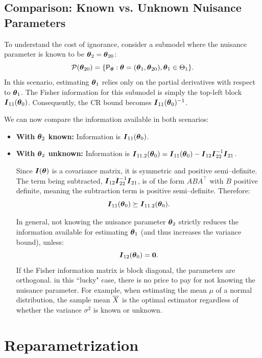 \subsection{Comparison: Known vs. Unknown Nuisance Parameters}

To understand the cost of ignorance, consider a submodel where the nuisance parameter is known to be $\boldsymbol{\theta}_2 = \boldsymbol{\theta}_{20}$:
\[
\mathcal{P}(\boldsymbol{\theta}_{20}) = \{ \mathsf{P}_{\boldsymbol{\theta}} : \boldsymbol{\theta} = (\boldsymbol{\theta}_1, \boldsymbol{\theta}_{20}), \boldsymbol{\theta}_1 \in \Theta_1 \}.
\]
In this scenario, estimating $\boldsymbol{\theta}_1$ relies only on the partial derivatives with respect to $\boldsymbol{\theta}_1$. The Fisher information for this submodel is simply the top-left block $\boldsymbol{I}_{11}(\boldsymbol{\theta}_0)$. Consequently, the CR bound becomes $\boldsymbol{I}_{11}(\boldsymbol{\theta}_0)^{-1}$.

We can now compare the information available in both scenarios:
\begin{itemize}
    \item \textbf{With $\boldsymbol{\theta}_2$ known:} Information is $\boldsymbol{I}_{11}(\boldsymbol{\theta}_0)$.
    \item \textbf{With $\boldsymbol{\theta}_2$ unknown:} Information is $\boldsymbol{I}_{11.2}(\boldsymbol{\theta}_0) = \boldsymbol{I}_{11}(\boldsymbol{\theta}_0) - \boldsymbol{I}_{12}\boldsymbol{I}_{22}^{-1}\boldsymbol{I}_{21}$.

Since $\boldsymbol{I}(\boldsymbol{\theta})$ is a covariance matrix, it is symmetric and positive semi--definite. The term being subtracted, $\boldsymbol{I}_{12}\boldsymbol{I}_{22}^{-1}\boldsymbol{I}_{21}$, is of the form $A B A^\top$ with $B$ positive definite, meaning the subtraction term is positive semi--definite. Therefore:
\[
\boldsymbol{I}_{11}(\boldsymbol{\theta}_0) \succeq \boldsymbol{I}_{11.2}(\boldsymbol{\theta}_0).
\]
\begin{remark}
    In general, not knowing the nuisance parameter $\boldsymbol{\theta}_2$ strictly reduces the information available for estimating $\boldsymbol{\theta}_1$ (and thus increases the variance bound), unless:
    \[
    \boldsymbol{I}_{12}(\boldsymbol{\theta}_0) = \boldsymbol{0}.
    \]
    If the Fisher information matrix is block diagonal, the parameters are orthogonal. in this ``lucky" case, there is no price to pay for not knowing the nuisance parameter. For example, when estimating the mean $\mu$ of a normal distribution, the sample mean $\overline{X}$ is the optimal estimator regardless of whether the variance $\sigma^2$ is known or unknown.
\end{remark}
\end{itemize}

\section{Reparametrization}
\label{sec:reparametrization}

